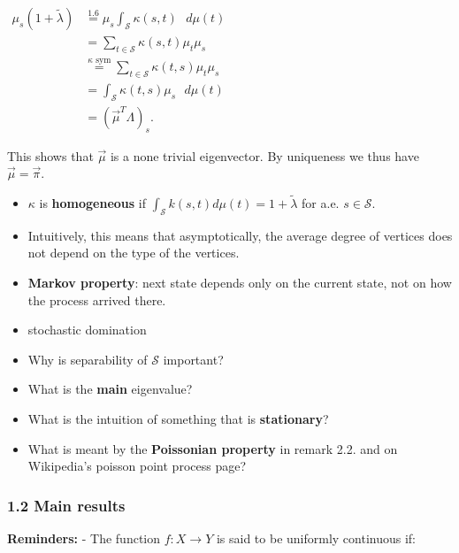 \documentclass[
  letterpaper,
  DIV=11,
  numbers=noendperiod]{scrartcl}
\providecommand{\tightlist}{%
  \setlength{\itemsep}{0pt}\setlength{\parskip}{0pt}}\usepackage{longtable,booktabs,array}
\begin{document}
\(\begin{align}
\mu_s (1 + \tilde{\lambda})
&\stackrel{\text{1.6}}{=} \mu_s \int_{\mathcal{S}} \kappa(s, t) \text{ } d\mu(t) \\
&= \sum_{t \in \mathcal{S}} \kappa(s, t) \mu_t \mu_s\\
&\stackrel{\kappa\text{ sym}}{=} \sum_{t \in \mathcal{S}} \kappa(t, s) \mu_t \mu_s\\
&= \int_{\mathcal{S}} \kappa(t, s) \mu_s \text{ } d\mu(t)\\
&= (\vec{\mu}^T \Lambda)_s.
\end{align}\)

This shows that \(\vec{\mu}\) is a none trivial eigenvector. By
uniqueness we thus have \(\vec{\mu} = \vec{\pi}\).

\begin{itemize}
\item
  \(\kappa\) is \textbf{homogeneous} if
  \(\int_{\mathcal{S}} k(s, t) d\mu(t) = 1 + \tilde{\lambda}\) for a.e.
  \(s \in \mathcal{S}\).
\item
  Intuitively, this means that asymptotically, the average degree of
  vertices does not depend on the type of the vertices.
\end{itemize}

\begin{itemize}
\tightlist
\item
  \textbf{Markov property}: next state depends only on the current
  state, not on how the process arrived there.
\item
  stochastic domination
\end{itemize}

\begin{itemize}
\item
  Why is separability of \(\mathcal{S}\) important?
\item
  What is the \textbf{main} eigenvalue?
\item
  What is the intuition of something that is \textbf{stationary}?
\item
  What is meant by the \textbf{Poissonian property} in remark 2.2. and
  on Wikipedia's poisson point process page?
\end{itemize}

\subsubsection{1.2 Main results}\label{main-results}

\textbf{Reminders:} - The function \(f: X \to Y\) is said to be
uniformly continuous if:
\end{document}
